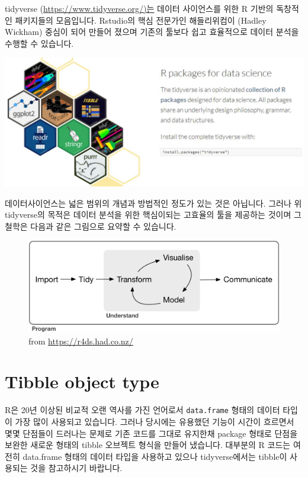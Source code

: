 \documentclass[
]{book}
\begin{document}
tidyverse (\url{https://www.tidyverse.org/)는} 데이터 사이언스를 위한 R 기반의 독창적인 패키지들의 모음입니다. Rstudio의 핵심 전문가인 해들리위컴이 (Hadley Wickham) 중심이 되어 만들어 졌으며 기존의 툴보다 쉽고 효율적으로 데이터 분석을 수행할 수 있습니다.

\includegraphics{images/07/tidyverse.JPG}

데이터사이언스는 넓은 범위의 개념과 방법적인 정도가 있는 것은 아닙니다. 그러나 위 tidyverse의 목적은 데이터 분석을 위한 핵심이되는 고효율의 툴을 제공하는 것이며 그 철학은 다음과 같은 그림으로 요약할 수 있습니다.

\begin{figure}
\centering
\includegraphics{images/07/data-science.png}
\caption{from \url{https://r4ds.had.co.nz/}}
\end{figure}

\hypertarget{tibble-object-type}{%
\section{Tibble object type}\label{tibble-object-type}}

R은 20년 이상된 비교적 오랜 역사를 가진 언어로서 \texttt{data.frame} 형태의 데이터 타입이 가장 많이 사용되고 있습니다. 그러나 당시에는 유용했던 기능이 시간이 흐르면서 몇몇 단점들이 드러나는 문제로 기존 코드를 그대로 유지한채 package 형태로 단점을 보완한 새로운 형태의 tibble 오브젝트 형식을 만들어 냈습니다. 대부분의 R 코드는 여전히 data.frame 형태의 데이터 타입을 사용하고 있으나 tidyverse에서는 tibble이 사용되는 것을 참고하시기 바랍니다.
\end{document}
